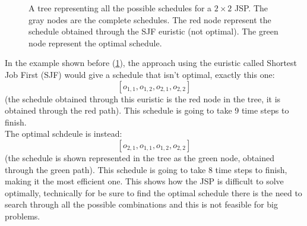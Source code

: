 \documentclass[12pt]{book}
\begin{document}
\begin{figure}[h]
\caption{A tree representing all the possible schedules for a $2\times2$ JSP. The gray nodes are the complete schedules. The red node represent the schedule obtained through the SJF euristic (not optimal). The green node represent the optimal schedule.}
\label{fig:Tree_schedule}
\end{figure}

In the example shown before (\ref{fig:Tree_schedule}), the approach using the euristic called Shortest Job First (SJF) would give a schedule that isn't optimal, exactly this one:
$$[o_{1,1}, o_{1,2}, o_{2,1}, o_{2,2}]$$
(the schedule obtained through this euristic is the red node in the tree, it is obtained through the red path). This schedule is going to take 9 time steps to finish.\\
The optimal schdeule is instead:
$$[o_{2,1}, o_{1,1}, o_{1,2}, o_{2,2}]$$
(the schedule is shown represented in the tree as the green node, obtained through the green path). This schedule is going to take 8 time steps to finish, making it the most efficient one.
This shows how the JSP is difficult to solve optimally, technically for be sure to find the optimal schedule there is the need to search through all the possible combinations and this is not feasible for big problems.
\end{document}
